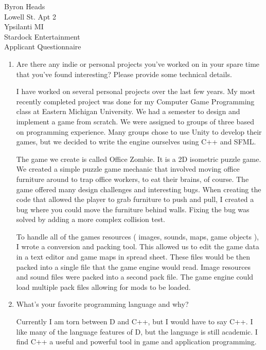 \documentclass[10pts,a4paper]{article}
\begin{document}
Byron Heads \\
 Lowell St.  Apt 2 \\
\indent Ypsilanti MI
\\

 Stardock Entertainment\\
\indent Applicant Questionnaire


\begin{enumerate}

\item Are there any indie or personal projects you've worked on in your spare time that you've found interesting? Please provide some technical details.

I have worked on several personal projects over the last few years.  My most recently completed project was done for my Computer Game Programming class at Eastern Michigan University.  We had a semester to design and implement a game from scratch.  We were assigned to groups of three based on programming experience.  Many groups chose to use Unity to develop their games, but we decided to write the engine ourselves using C++ and SFML.

The game we create is called Office Zombie.  It is a 2D isometric puzzle game.  We created a simple puzzle game mechanic that involved moving office furniture around to trap office workers, to eat their brains, of course.  The game offered many design challenges and interesting bugs.  When creating the code that allowed the player to grab furniture to push and pull, I created a bug where you could move the furniture behind walls.  Fixing the bug was solved by adding a more complex collision test.

To handle all of the games resources ( images, sounds, maps, game objects ), I wrote a  conversion and packing tool.  This allowed us to edit the game data in a text editor and game maps in spread sheet.  These files would be then packed into a single file that the game engine would read.  Image resources and sound files were packed into a second pack file.  The game engine could load multiple pack files allowing for mods to be loaded.


\item What's your favorite programming language and why?

Currently I am torn between D and C++, but I would have to say C++.  I like many of the language features of D, but the language is still academic.  I find C++ a useful and powerful tool in game and application programming.


\end{enumerate}
\end{document}
